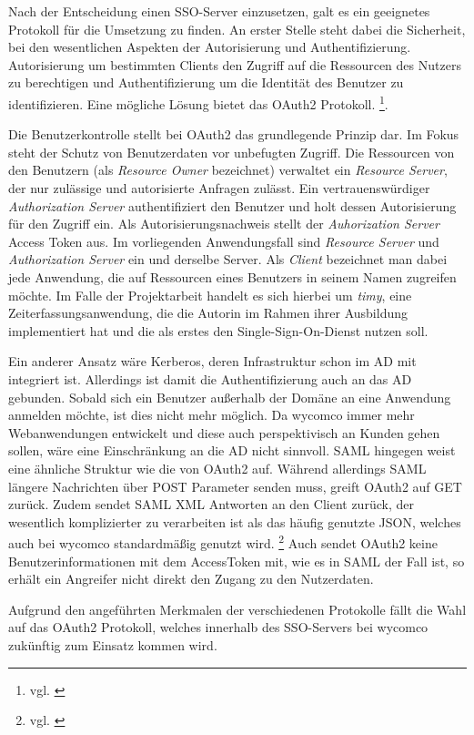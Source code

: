 Nach der Entscheidung einen \ac{SSO}-Server einzusetzen, galt es ein geeignetes Protokoll für die Umsetzung zu finden. An erster Stelle steht dabei die Sicherheit, bei den wesentlichen Aspekten der Autorisierung und Authentifizierung. Autorisierung um bestimmten Clients den Zugriff auf die Ressourcen des Nutzers zu berechtigen und Authentifizierung um die Identität des Benutzer zu identifizieren. Eine mögliche Lösung bietet das OAuth2 Protokoll. \footnote{vgl. \cite{OAuth2}}.

Die Benutzerkontrolle stellt bei OAuth2 das grundlegende Prinzip dar. Im Fokus steht der Schutz von Benutzerdaten vor unbefugten Zugriff. Die Ressourcen von den Benutzern (als \textit{Resource Owner} bezeichnet) verwaltet ein \textit{Resource Server}, der nur zulässige und autorisierte Anfragen zulässt. Ein vertrauenswürdiger \textit{Authorization Server} authentifiziert den Benutzer und holt dessen Autorisierung für den Zugriff ein. Als Autorisierungsnachweis stellt der \textit{Auhorization Server} Access Token aus. Im vorliegenden Anwendungsfall sind \textit{Resource Server} und \textit{Authorization Server} ein und derselbe Server.
Als \textit{Client} bezeichnet man dabei jede Anwendung, die auf Ressourcen eines Benutzers in seinem Namen zugreifen möchte. Im Falle der Projektarbeit handelt es sich hierbei um \textit{timy}, eine Zeiterfassungsanwendung, die die Autorin im Rahmen ihrer Ausbildung implementiert hat und die als erstes den Single-Sign-On-Dienst nutzen soll. 

Ein anderer Ansatz wäre Kerberos, deren Infrastruktur schon im \ac{AD} mit integriert ist. Allerdings ist damit die Authentifizierung auch an das \ac{AD} gebunden. Sobald sich ein Benutzer außerhalb der Domäne an eine Anwendung anmelden möchte, ist dies nicht mehr möglich. Da wycomco immer mehr Webanwendungen entwickelt und diese auch perspektivisch an Kunden gehen sollen, wäre eine Einschränkung an die AD nicht sinnvoll. 
\acs{SAML} hingegen weist eine ähnliche Struktur wie die von OAuth2 auf. Während allerdings SAML längere Nachrichten über POST Parameter senden muss, greift OAuth2 auf GET zurück. Zudem sendet SAML \acs{XML} Antworten an den Client zurück, der wesentlich komplizierter zu verarbeiten ist als das häufig genutzte \acs{JSON}, welches auch bei wycomco standardmäßig genutzt wird. \footnote{vgl. \cite{SSO-Vgl}}
Auch sendet OAuth2 keine Benutzerinformationen mit dem AccessToken mit, wie es in SAML der Fall ist, so erhält ein Angreifer nicht direkt den Zugang zu den Nutzerdaten.

Aufgrund den angeführten Merkmalen der verschiedenen Protokolle fällt die Wahl auf das OAuth2 Protokoll, welches innerhalb des \ac{SSO}-Servers bei wycomco zukünftig zum Einsatz kommen wird. 

